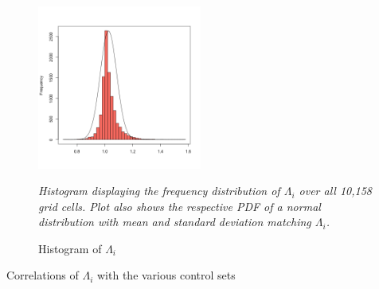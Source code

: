 \documentclass[11pt, oneside]{article}   	%
\newcommand{\mysubcaption}[1]{
\justify
\begin{spacing}{0.7}
\textit{\footnotesize #1}
\end{spacing}}
\begin{document}
\begin{spacing}{1.3}
  \begin{figure}[!h]
  \centering
  \caption{Histogram of $\Lambda_{i}$}

  \includegraphics[width=0.48\textwidth,trim={1cm 1cm 1cm 1.5cm},clip]{../../Analysis/output/descriptives/histogram.png}
  \label{fig:APP:histogram_lambda}

  \mysubcaption{Histogram displaying the frequency distribution of $\Lambda_{i}$ over all 10,158 grid cells. Plot also shows the respective PDF of a normal distribution with mean and standard deviation matching $\Lambda_{i}$.}
  \end{figure}

    \begin{table}[h] \centering
      \caption{Correlations of $\Lambda_{i}$ with the various control sets}
      \label{tab:APP:basic_corrs}
      \resizebox{!}{0.48\textheight}{


}
\end{table}
\end{spacing}
\end{document}
